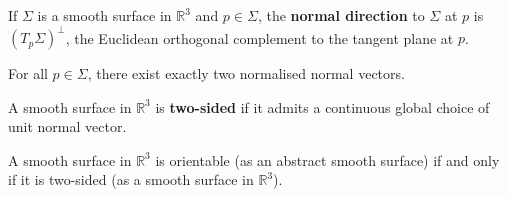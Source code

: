 \documentclass[a4paper,11pt]{article}
\begin{document}
\begin{definition}
	If \( \Sigma \) is a smooth surface in \( \mathbb R^3 \) and \( p \in \Sigma \), the \textbf{normal direction} to \( \Sigma \) at \( p \) is \( (T_p \Sigma)^\perp \), the Euclidean orthogonal complement to the tangent plane at \( p \).
\end{definition}
\begin{remark}
	For all \( p \in \Sigma \), there exist exactly two normalised normal vectors.
\end{remark}
\begin{definition}
	A smooth surface in \( \mathbb R^3 \) is \textbf{two-sided} if it admits a continuous global choice of unit normal vector.
\end{definition}
\begin{lemma}
	A smooth surface in \( \mathbb R^3 \) is orientable (as an abstract smooth surface) if and only if it is two-sided (as a smooth surface in \( \mathbb R^3 \)).
\end{lemma}
\end{document}
